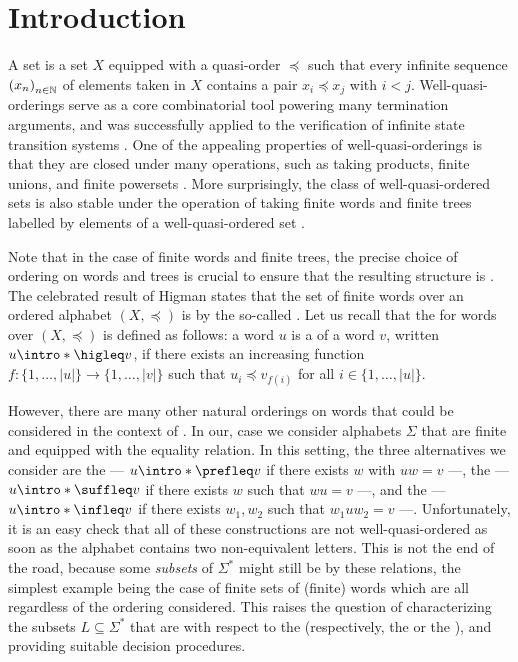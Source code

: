 \section{Introduction}
\label{introduction:sec}

A  set is a set $X$ equipped with a quasi-order
$\preceq$ such that every infinite sequence $\seqof{x_n}$ of elements taken in
$X$ contains a pair $x_i \preceq x_j$ with $i < j$. Well-quasi-orderings serve
as a core combinatorial tool powering many termination arguments, and was
successfully applied to the verification of infinite state transition systems
\cite{ABDU96,ABDU98}. One of the appealing properties of well-quasi-orderings
is that they are closed under many operations, such as taking products, finite
unions, and finite powersets \cite{SCSC12}. More surprisingly, the class of
well-quasi-ordered sets is also stable under the operation of taking finite
words and finite trees labelled by elements of a well-quasi-ordered set
\cite{HIG52,KRU72}.

\AP
Note that in the case of finite words and finite trees, the precise choice of
ordering on words and trees is crucial to ensure that the resulting structure
is . The celebrated result of Higman states that the set
of finite words over an ordered alphabet $(X, \preceq)$ is
 by the so-called 
\cite{HIG52}. Let us recall that the  for words over $(X,
\preceq)$ is defined as follows: a word $u$ is a  of a word $v$,
written $u \intro*\higleq v$,
if there exists an increasing function $f \colon \{1, \ldots, |u|\} \to \{1,
\ldots, |v|\}$ such that $u_i \preceq v_{f(i)}$ for all $i \in \{1, \ldots,
|u|\}$.

\AP
However, there are many other natural orderings on words that could be
considered in the context of . In our, case we
consider alphabets $\Sigma$ that are finite and equipped with the equality
relation. In this setting, the three alternatives we consider are the
 --- $u \intro*\prefleq v$ if there exists $w$ with $uw
= v$ ---, the  --- $u \intro*\suffleq v$ if there exists
$w$ such that $wu = v$ ---, and the  --- $u
\intro*\infleq v$ if there exists $w_1,w_2$ such that $w_1 u w_2 = v$ ---.
Unfortunately, it is an easy check that all of these constructions are not
well-quasi-ordered as soon as the alphabet contains two non-equivalent letters.
This is not the end of the road, because some \emph{subsets} of $\Sigma^*$
might still be  by these relations, the simplest example
being the case of finite sets of (finite) words which are all
 regardless of the ordering considered. This raises the
question of characterizing the subsets $L \subseteq \Sigma^*$ that are
 with respect to the  (respectively,
the  or the ), and providing suitable
decision procedures.


